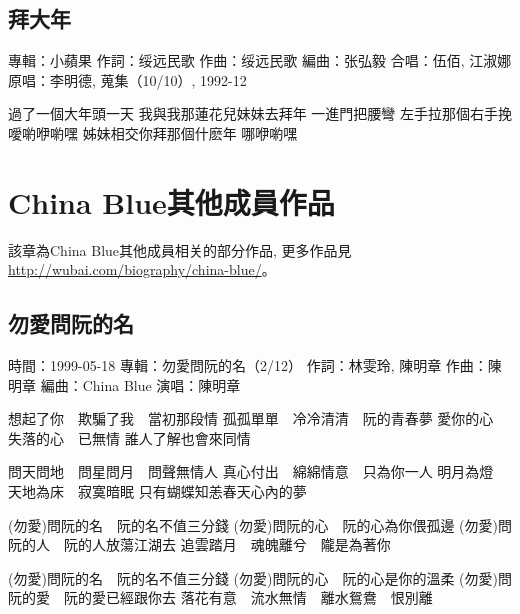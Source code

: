 \documentclass[UTF8,a4paper,oneside,twocolumn,12pt]{ctexbook}
\newcommand{\infopair}[2]{\textbullet #1：#2}
\newcommand{\zc}[1][伍佰]{\infopair{作詞}{#1}}
\newcommand{\zq}[1][伍佰]{\infopair{作曲}{#1}}
\newcommand{\bq}[1][伍佰]{\infopair{編曲}{#1}}
\newcommand{\zj}[1]{\infopair{專輯}{#1}}
\newcommand{\yc}[1]{\infopair{原唱}{#1}}
\newcommand{\sj}[1]{\infopair{時間}{#1}}
\newenvironment{info}{\begin{flushleft}\kaishu
	}
	{\end{flushleft}\normalsize\yahei\par}
\newenvironment{lyric}{
	}
{}
\begin{document}
\section{拜大年} %
\begin{info}
	\zj{小蘋果}
	\zc[绥远民歌] %
	\zq[绥远民歌]
	\bq[张弘毅]
	\infopair{合唱}{伍佰, 江淑娜}
	\yc{李明德, 蒐集（10/10）, 1992-12}
\end{info}
\begin{lyric}
	過了一個大年頭一天
	我與我那蓮花兒妹妹去拜年
	一進門把腰彎
	左手拉那個右手挽
	噯喲咿喲嘿
	姊妹相交你拜那個什麽年
	哪咿喲嘿
\end{lyric}

\chapter{China Blue其他成員作品}
該章為China Blue其他成員相关的部分作品, 更多作品見 \url{http://wubai.com/biography/china-blue/}。%

\section{勿愛問阮的名}
\begin{info}
	\sj{1999-05-18}
	\zj{勿愛問阮的名（2/12）}
	\zc[林雯玲, 陳明章]
	\zq[陳明章]
	\bq[China Blue]
	\infopair{演唱}{陳明章}
\end{info}
\begin{lyric}
	想起了你　欺騙了我　當初那段情
	孤孤單單　冷冷清清　阮的青春夢
	愛你的心　失落的心　已無情
	誰人了解也會來同情

	問天問地　問星問月　問聲無情人
	真心付出　綿綿情意　只為你一人
	明月為燈　天地為床　寂寞暗眠
	只有蝴蝶知恙春天心內的夢

	(勿愛)問阮的名　阮的名不值三分錢
	(勿愛)問阮的心　阮的心為你偎孤邊
	(勿愛)問阮的人　阮的人放蕩江湖去
	追雲踏月　魂魄離兮　隴是為著你

	(勿愛)問阮的名　阮的名不值三分錢
	(勿愛)問阮的心　阮的心是你的溫柔
	(勿愛)問阮的愛　阮的愛已經跟你去
	落花有意　流水無情　離水鴛鴦　恨別離
\end{lyric}
\end{document}

